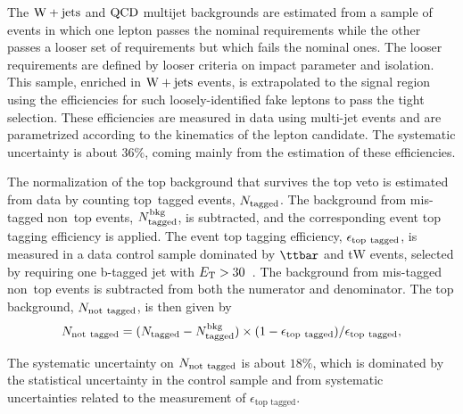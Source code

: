 
The $\mathrm{W+jets}$ and ${\rm QCD}$ multijet backgrounds are estimated from a sample
of events in which one lepton passes the nominal requirements while
the other passes a looser set of requirements but which fails the
nominal ones.  The looser requirements are defined by looser criteria on
impact parameter and isolation.
This sample, enriched in $\mathrm{W+jets}$ events,
is extrapolated to the signal region using the efficiencies for such
loosely-identified fake leptons to pass the tight selection. These efficiencies
are measured in data using multi-jet events and are parametrized according
to the kinematics of the lepton candidate. 
The systematic uncertainty is about $36\%$, coming mainly from the
estimation of these efficiencies.

The normalization of the top background that survives the top veto
is estimated from data by
counting top~tagged events, $N_{\rm tagged}$. The background from
mis-tagged non~top events, $N_{\rm tagged}^{\rm bkg}$, is subtracted,
and the corresponding event top tagging efficiency is applied.
The event top tagging efficiency, $\epsilon_{\rm top~tagged}$, is measured in a 
data control sample dominated by $\ttbar$ and tW events, selected by
requiring one b-tagged jet with $E_\mathrm{T} > 30$~\GeV. The background from mis-tagged non~top events
is subtracted from both the numerator and denominator. 
The top background, $N_{\rm not~tagged}$, is then given by
%
\begin{eqnarray*}
N_{\rm not~tagged} = (N_{\rm tagged} - N_{\rm tagged}^{\rm bkg}) \times (1-\epsilon_{\rm top~tagged})/\epsilon_{\rm top~tagged},
\label{eq:topest}
\end{eqnarray*}

The systematic uncertainty on $N_{\rm not~tagged}$
is about $18\%$, which is dominated by the statistical uncertainty in the
control sample and from systematic uncertainties related to the measurement
of $\epsilon_\text{top tagged}$.


